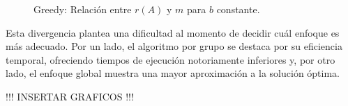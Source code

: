 \begin{figure}[h]
\begin{minipage}{0.45\textwidth}
        \caption{Greedy: Relación entre $r(A)$ y $m$ para $b$ constante.}
        \label{fig:medicion_r_greedy_var_m}
    \end{minipage}
\end{figure}

Esta divergencia plantea una dificultad al momento de decidir cuál enfoque es más adecuado. Por un lado, el algoritmo por grupo se destaca por su eficiencia temporal, ofreciendo tiempos de ejecución notoriamente inferiores y, por otro lado, el enfoque global muestra una mayor aproximación a la solución óptima.

!!! INSERTAR GRAFICOS !!!


